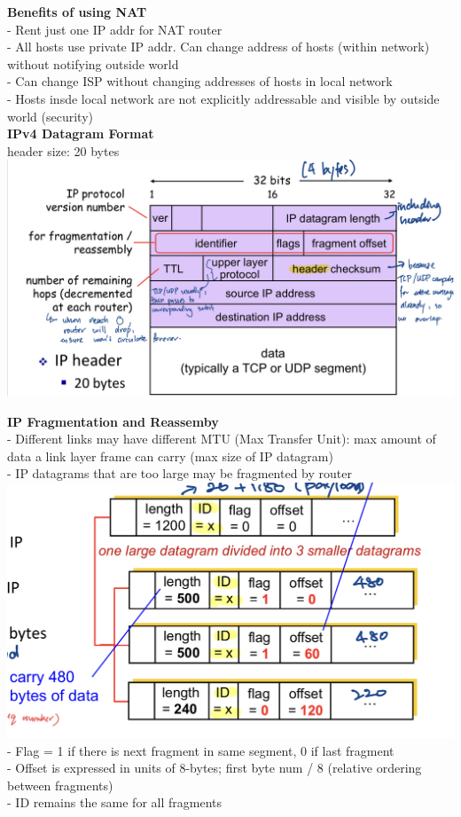 \documentclass[10pt, a4paper]{article}
\newcommand{\blue}[1]{{\color{MidnightBlue}#1}}
\newcommand{\red}[1]{{\color{red}#1}}
\begin{document}
\begin{multicols*}{3}
		\textbf{Benefits of using NAT}\\
		- Rent just one IP addr for NAT router\\
		- All hosts use private IP addr. Can change address of hosts (within network) without notifying outside world\\
		- Can change ISP without changing addresses of hosts in local network\\
		- Hosts insde local network are not explicitly addressable and visible by outside world (security)\\

		\textbf{IPv4 Datagram Format}\\
		header size: 20 \blue{bytes}\\
		\includegraphics[scale=.14]{./assets/ipDatagram}

		\textbf{IP Fragmentation and Reassemby}\\
		- Different links may have different \blue{MTU} (Max Transfer Unit): max amount of data a link layer frame can carry (max size of IP datagram)\\
		- IP datagrams that are too large may be fragmented by router\\
		\includegraphics[scale=.15]{./assets/ipFragmentation}\\
		- Flag = 1 if there is next fragment in same segment, 0 if last fragment\\
		- Offset is expressed in units of \red{8-bytes}; first byte num / 8 (relative ordering between fragments)\\
		- ID remains the same for all fragments\\


\end{multicols*}
\end{document}

